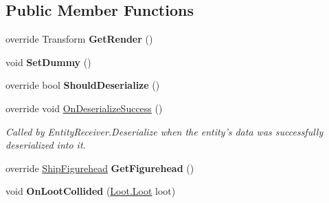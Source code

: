\subsection*{Public Member Functions}
\begin{DoxyCompactItemize}
\item 
\hypertarget{class_skyrates_1_1_client_1_1_entity_player_ship_a7550d6b6cabb315bc4df868dde129f23}{override Transform {\bfseries Get\-Render} ()}\label{class_skyrates_1_1_client_1_1_entity_player_ship_a7550d6b6cabb315bc4df868dde129f23}

\item 
\hypertarget{class_skyrates_1_1_client_1_1_entity_player_ship_a07c9178e033dfc799ae25af543029c12}{void {\bfseries Set\-Dummy} ()}\label{class_skyrates_1_1_client_1_1_entity_player_ship_a07c9178e033dfc799ae25af543029c12}

\item 
\hypertarget{class_skyrates_1_1_client_1_1_entity_player_ship_a1d9463f5a6af5211c086a2b8c0a7e920}{override bool {\bfseries Should\-Deserialize} ()}\label{class_skyrates_1_1_client_1_1_entity_player_ship_a1d9463f5a6af5211c086a2b8c0a7e920}

\item 
override void \hyperlink{class_skyrates_1_1_client_1_1_entity_player_ship_ab7106388ce039e10be38c27906372312}{On\-Deserialize\-Success} ()
\begin{DoxyCompactList}\small\item\em Called by Entity\-Receiver.\-Deserialize when the entity's data was successfully deserialized into it. \end{DoxyCompactList}\item 
\hypertarget{class_skyrates_1_1_client_1_1_entity_player_ship_a39e0734f191fe2b2e22bb2559deda8c1}{override \hyperlink{class_skyrates_1_1_client_1_1_ship_1_1_ship_figurehead}{Ship\-Figurehead} {\bfseries Get\-Figurehead} ()}\label{class_skyrates_1_1_client_1_1_entity_player_ship_a39e0734f191fe2b2e22bb2559deda8c1}

\item 
\hypertarget{class_skyrates_1_1_client_1_1_entity_player_ship_a59ebb3e87c308adc192a0074ce591d0c}{void {\bfseries On\-Loot\-Collided} (\hyperlink{class_skyrates_1_1_client_1_1_loot_1_1_loot}{Loot.\-Loot} loot)}\label{class_skyrates_1_1_client_1_1_entity_player_ship_a59ebb3e87c308adc192a0074ce591d0c}

\end{DoxyCompactItemize}
